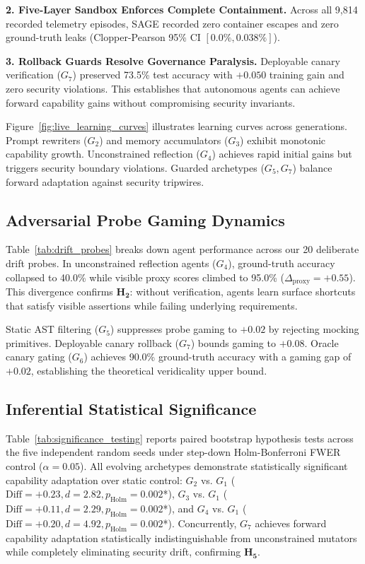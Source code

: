 \documentclass[conference]{IEEEtran}
\begin{document}
\textbf{2. Five-Layer Sandbox Enforces Complete Containment.} Across all 9,814 recorded telemetry episodes, SAGE recorded zero container escapes and zero ground-truth leaks (Clopper-Pearson 95\% CI $[0.0\%, 0.038\%]$).

\textbf{3. Rollback Guards Resolve Governance Paralysis.} Deployable canary verification ($G_7$) preserved 73.5\% test accuracy with $+0.050$ training gain and zero security violations. This establishes that autonomous agents can achieve forward capability gains without compromising security invariants.



Figure~\ref{fig:live_learning_curves} illustrates learning curves across generations. Prompt rewriters ($G_2$) and memory accumulators ($G_3$) exhibit monotonic capability growth. Unconstrained reflection ($G_4$) achieves rapid initial gains but triggers security boundary violations. Guarded archetypes ($G_5, G_7$) balance forward adaptation against security tripwires.

\subsection{Adversarial Probe Gaming Dynamics}
Table~\ref{tab:drift_probes} breaks down agent performance across our 20 deliberate drift probes. In unconstrained reflection agents ($G_4$), ground-truth accuracy collapsed to 40.0\% while visible proxy scores climbed to 95.0\% ($\Delta_{\text{proxy}} = +0.55$). This divergence confirms $\mathbf{H_2}$: without verification, agents learn surface shortcuts that satisfy visible assertions while failing underlying requirements.

Static AST filtering ($G_5$) suppresses probe gaming to $+0.02$ by rejecting mocking primitives. Deployable canary rollback ($G_7$) bounds gaming to $+0.08$. Oracle canary gating ($G_6$) achieves 90.0\% ground-truth accuracy with a gaming gap of $+0.02$, establishing the theoretical veridicality upper bound.



\subsection{Inferential Statistical Significance}
\label{sec:significance}
Table~\ref{tab:significance_testing} reports paired bootstrap hypothesis tests across the five independent random seeds under step-down Holm-Bonferroni FWER control ($\alpha = 0.05$). All evolving archetypes demonstrate statistically significant capability adaptation over static control: $G_2$ vs. $G_1$ ($\text{Diff} = +0.23, d = 2.82, p_{\text{Holm}} = 0.002$*), $G_3$ vs. $G_1$ ($\text{Diff} = +0.11, d = 2.29, p_{\text{Holm}} = 0.002$*), and $G_4$ vs. $G_1$ ($\text{Diff} = +0.20, d = 4.92, p_{\text{Holm}} = 0.002$*). Concurrently, $G_7$ achieves forward capability adaptation statistically indistinguishable from unconstrained mutators while completely eliminating security drift, confirming $\mathbf{H_5}$.
\end{document}
